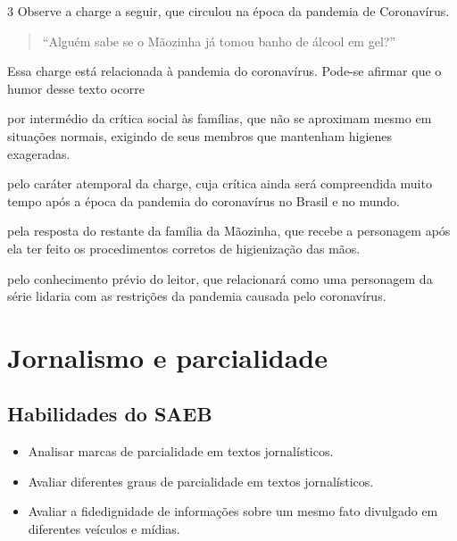 \num{3} Observe a charge a seguir, que circulou na época da pandemia de
Coronavírus.


\begin{quote}
``Alguém sabe se o Mãozinha já tomou banho de álcool em gel?''
\end{quote}

Essa charge está relacionada à pandemia do coronavírus. Pode-se afirmar
que o humor desse texto ocorre

\begin{escolha}
\item por intermédio da crítica social às famílias, que não se aproximam
mesmo em situações normais, exigindo de seus membros que mantenham
higienes exageradas.

\item pelo caráter atemporal da charge, cuja crítica ainda será
compreendida muito tempo após a época da pandemia do coronavírus no
Brasil e no mundo.

\item pela resposta do restante da família da Mãozinha, que recebe a
personagem após ela ter feito os procedimentos corretos de higienização
das mãos.

\item pelo conhecimento prévio do leitor, que relacionará como uma
personagem da série lidaria com as restrições da pandemia causada pelo
coronavírus.
\end{escolha}


\chapter{Jornalismo e parcialidade}

\section{Habilidades do SAEB}

\begin{itemize}
\item Analisar marcas de parcialidade em textos jornalísticos.

\item Avaliar diferentes graus de parcialidade em textos jornalísticos.

\item Avaliar a fidedignidade de informações sobre um mesmo fato divulgado
em diferentes veículos e mídias.
\end{itemize}

